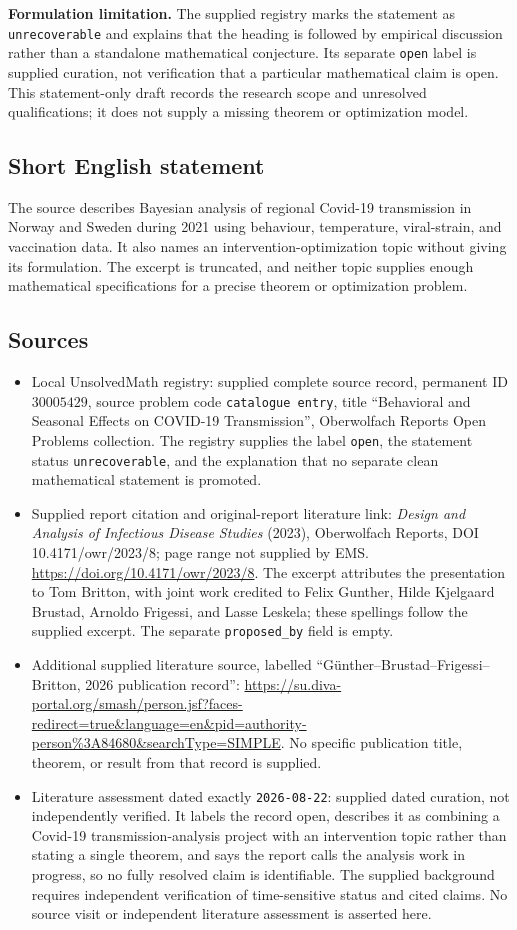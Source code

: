 \documentclass[11pt]{article}
\begin{document}
\textbf{Formulation limitation.} The supplied registry marks the statement as \texttt{unrecoverable} and explains that the heading is followed by empirical discussion rather than a standalone mathematical conjecture. Its separate \texttt{open} label is supplied curation, not verification that a particular mathematical claim is open. This statement-only draft records the research scope and unresolved qualifications; it does not supply a missing theorem or optimization model.
\subsection{Short English statement}
The source describes Bayesian analysis of regional Covid-19 transmission in Norway and Sweden during 2021 using behaviour, temperature, viral-strain, and vaccination data. It also names an intervention-optimization topic without giving its formulation. The excerpt is truncated, and neither topic supplies enough mathematical specifications for a precise theorem or optimization problem.
\subsection{Sources}
\begin{itemize}
\item Local UnsolvedMath registry: supplied complete source record, permanent ID \(30005429\), source problem code \texttt{catalogue entry}, title ``Behavioral and Seasonal Effects on COVID-19 Transmission'', Oberwolfach Reports Open Problems collection. The registry supplies the label \texttt{open}, the statement status \texttt{unrecoverable}, and the explanation that no separate clean mathematical statement is promoted.
\item Supplied report citation and original-report literature link: \emph{Design and Analysis of Infectious Disease Studies} (2023), Oberwolfach Reports, DOI 10.4171/owr/2023/8; page range not supplied by EMS. \url{https://doi.org/10.4171/owr/2023/8}. The excerpt attributes the presentation to Tom Britton, with joint work credited to Felix Gunther, Hilde Kjelgaard Brustad, Arnoldo Frigessi, and Lasse Leskela; these spellings follow the supplied excerpt. The separate \texttt{proposed\_by} field is empty.
\item Additional supplied literature source, labelled ``G\"unther--Brustad--Frigessi--Britton, 2026 publication record'': \url{https://su.diva-portal.org/smash/person.jsf?faces-redirect=true&language=en&pid=authority-person%3A84680&searchType=SIMPLE}. No specific publication title, theorem, or result from that record is supplied.
\item Literature assessment dated exactly \texttt{2026-08-22}: supplied dated curation, not independently verified. It labels the record open, describes it as combining a Covid-19 transmission-analysis project with an intervention topic rather than stating a single theorem, and says the report calls the analysis work in progress, so no fully resolved claim is identifiable. The supplied background requires independent verification of time-sensitive status and cited claims. No source visit or independent literature assessment is asserted here.
\end{itemize}
\end{document}
